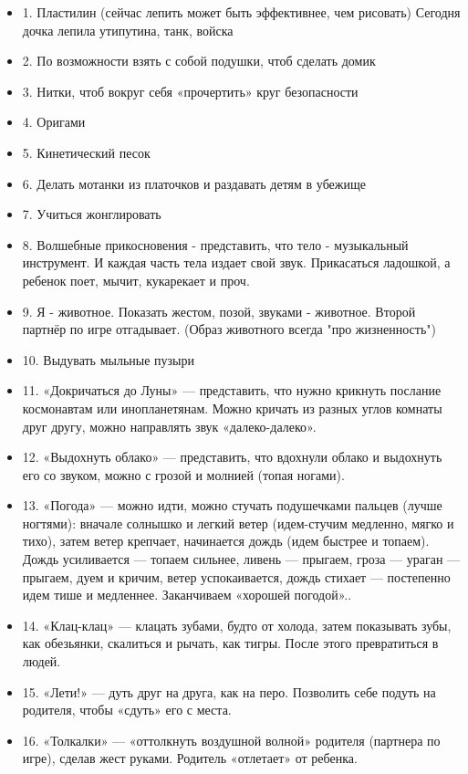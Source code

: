 \begin{itemize}
  \item 1. Пластилин (сейчас лепить может быть эффективнее, чем рисовать) Сегодня дочка лепила утипутина, танк, войска
  \item 2. По возможности взять с собой подушки, чтоб сделать домик
  \item 3. Нитки, чтоб вокруг себя «прочертить» круг безопасности
  \item 4. Оригами
  \item 5. Кинетический песок
  \item 6. Делать мотанки из платочков и раздавать детям в убежище
  \item 7. Учиться жонглировать
  \item 8. Волшебные прикосновения - представить, что тело - музыкальный инструмент. И каждая часть тела издает свой звук. Прикасаться ладошкой, а ребенок поет, мычит, кукарекает и проч.
  \item 9. Я - животное. Показать жестом, позой, звуками - животное. Второй партнёр по игре отгадывает. (Образ животного всегда "про жизненность")
  \item 10. Выдувать мыльные пузыри
  \item 11. «Докричаться до Луны» — представить, что нужно крикнуть послание космонавтам или инопланетянам. Можно кричать из разных углов комнаты друг другу, можно направлять звук «далеко-далеко».
  \item 12. «Выдохнуть облако» — представить, что вдохнули облако и выдохнуть его со звуком, можно с грозой и молнией (топая ногами).
  \item 13. «Погода» — можно идти, можно стучать подушечками пальцев (лучше ногтями): вначале солнышко и легкий ветер (идем-стучим медленно, мягко и тихо), затем ветер крепчает, начинается дождь (идем быстрее и топаем). Дождь усиливается — топаем сильнее, ливень — прыгаем, гроза — ураган — прыгаем, дуем и кричим, ветер успокаивается, дождь стихает — постепенно идем тише и медленнее. Заканчиваем «хорошей погодой»..
  \item 14. «Клац-клац» — клацать зубами, будто от холода, затем показывать зубы, как обезьянки, скалиться и рычать, как тигры. После этого превратиться в людей.
  \item 15. «Лети!» — дуть друг на друга, как на перо. Позволить себе подуть на родителя, чтобы «сдуть» его с места.
  \item 16. «Толкалки» — «оттолкнуть воздушной волной» родителя (партнера по игре), сделав жест руками. Родитель «отлетает» от ребенка.

\end{itemize}
